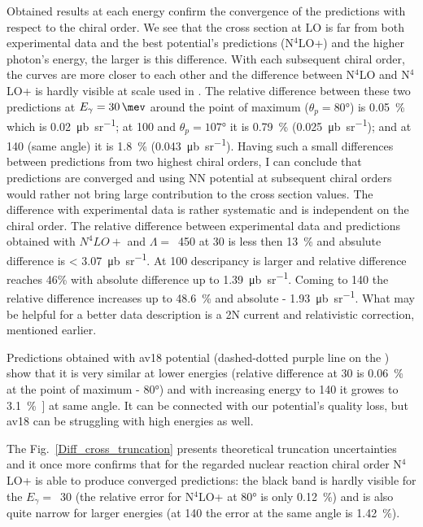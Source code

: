     Obtained results at each energy confirm the convergence 
    of the predictions with respect to the chiral order.
    We see that the cross section at LO is far from both experimental 
    data and the best potential's predictions (N$^4$LO+) and
    the higher photon's energy, the larger is this
    difference. With each subsequent chiral order, the 
    curves are more closer to each other and the difference
    between N$^4$LO and N$^4$LO+ is hardly visible at scale used in .
    The relative difference between these two predictions at $E_\gamma=\SI{30}{\mev}$ around the point of maximum 
    ($\theta_p = \ang{80}$) is \SI{0.05}{\percent} which is \SI{0.02}{\micro \barn \per \steradian};
    at \SI{100}{\mev} and $\theta_p = \ang{107}$ it is \SI{0.79}{\percent} (\SI{0.025}{\micro \barn \per \steradian});
    and at \SI{140}{\mev} (same angle) it is \SI{1.8}{\percent} (\SI{0.043}{\micro \barn \per \steradian}).
    Having such a small differences between predictions from two highest chiral orders,
    I can conclude that predictions are converged and 
    using NN potential at subsequent chiral orders would rather not bring large contribution 
    to the cross section values. 
    The difference with experimental data is rather systematic 
    and is independent on the chiral order. 
    The relative difference between experimental data and predictions obtained with $N^4LO+$ and $\Lambda=$~\SI{450}{\mev} at \SI{30}{\mev} is less then \SI{13}{\percent}
    and absulute difference is < \SI{3.07}{\micro \barn \per \steradian}.
    At \SI{100}{\mev} descripancy is larger and relative difference reaches 46\% with absolute difference up to \SI{1.39}{\micro \barn \per \steradian}.
    Coming to \SI{140}{\mev} the relative difference 
    increases up to \SI{48.6}{\percent} and absolute - \SI{1.93}{\micro \barn \per \steradian}.
    What may be helpful
    for a better data description is a 2N current 
    and relativistic correction, mentioned earlier.

    Predictions obtained with \gls*{av18} potential (dashed-dotted purple line on the ) show that
    it is very similar at lower energies (relative difference at \SI{30}{\mev} is \SI{0.06}{\percent}
    at the point of maximum - \ang{80}) and with increasing energy to \SI{140}{\mev}
    it growes to \SI{3.1}{\percent]} at same angle. 
    It can be connected with our potential's quality loss, but \gls*{av18} can
    be struggling with high energies as well.

    The Fig.~\ref{Diff_cross_truncation} 
    presents theoretical truncation uncertainties and it once more
    confirms that for the regarded nuclear reaction chiral order
    N$^4$LO+ is able to produce converged predictions: 
    the black band is hardly visible for the $E_\gamma=$~\SI{30}{\mev}
    (the relative error for N$^4$LO+ at \ang{80} is only \SI{0.12}{\percent})
    and is also quite narrow for larger energies (at \SI{140}{\mev} 
    the error at the same angle is \SI{1.42}{\percent}). 


